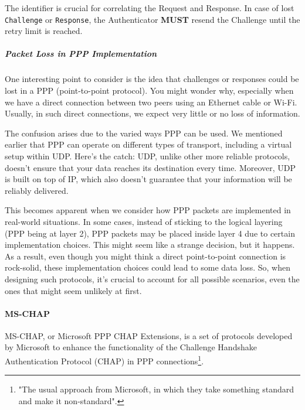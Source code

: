 The identifier is crucial for correlating the Request and Response. In case of lost \texttt{Challenge} or \texttt{Response}, the Authenticator \textbf{MUST} resend the Challenge until the retry limit is reached.



\subparagraph*{Packet Loss in PPP Implementation}
One interesting point to consider is the idea that challenges or responses could be lost in a PPP (point-to-point protocol). You might wonder why, especially when we have a direct connection between two peers using an Ethernet cable or Wi-Fi. Usually, in such direct connections, we expect very little or no loss of information.

The confusion arises due to the varied ways PPP can be used. We mentioned earlier that PPP can operate on different types of transport, including a virtual setup within UDP. Here's the catch: UDP, unlike other more reliable protocols, doesn't ensure that your data reaches its destination every time. Moreover, UDP is built on top of IP, which also doesn't guarantee that your information will be reliably delivered.

This becomes apparent when we consider how PPP packets are implemented in real-world situations. In some cases, instead of sticking to the logical layering (PPP being at layer 2), PPP packets may be placed inside layer 4 due to certain implementation choices. This might seem like a strange decision, but it happens. As a result, even though you might think a direct point-to-point connection is rock-solid, these implementation choices could lead to some data loss. So, when designing such protocols, it's crucial to account for all possible scenarios, even the ones that might seem unlikely at first.


\paragraph{MS-CHAP}
MS-CHAP, or Microsoft PPP CHAP Extensions, is a set of protocols developed by Microsoft to enhance the functionality of the Challenge Handshake Authentication Protocol (CHAP) in PPP connections\footnote{"The usual approach from Microsoft, in which they take something standard and make it non-standard".}.


